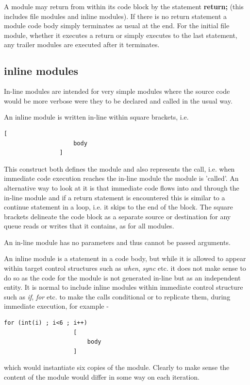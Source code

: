             A module may return from within its code block by the statement {\bf
            return;} (this includes file modules and inline modules). If there
            is no return statement a module code body simply terminates as usual
            at the end. For the initial file module, whether it executes a
            return or simply executes to the last statement, any trailer modules
            are executed after it terminates.

        \subsection{inline modules}

            In-line modules are intended for very simple modules where the
            source code would be more verbose were they to be
            declared and called in the usual way.

            An inline module is written in-line within square brackets,
            i.e.
            \begin{lstlisting}[gobble=12, language=threepl]
                [
                    body
                ]
            \end{lstlisting}
            
            This construct both defines the module and also represents the call,
            i.e. when immediate code execution reaches the in-line module the
            module is 'called'. An alternative way to look at it is that immediate
            code flows into and through the in-line module and if a return statement is
            encountered this is similar to a continue statement in a loop, i.e. it
            skips to the end of the block. The square brackets delineate the code
            block as a separate source or destination for any queue reads or writes
            that it contains, as for all modules.
            
            An in-line module has no parameters and thus cannot be passed
            arguments.

            An inline module is a statement in a code body, but while it
            is allowed to appear within target control structures such as
            {\em when}, {\em sync} etc. it does not make sense to do so
            as the code for the module is not generated in-line but as an
            independent entity. It is normal to include inline modules
            within immediate control structure such as {\em if}, {\em
            for} etc. to make the calls conditional or to replicate them,
            during immediate execution, for example -
            \begin{lstlisting}[gobble=12, language=threepl]
                for (int(i) ; i<6 ; i++)
                    [
                        body
                    ]
            \end{lstlisting}
            which would instantiate six copies of the module. Clearly to make
            sense the content of the module would differ in some way on each
            iteration.

